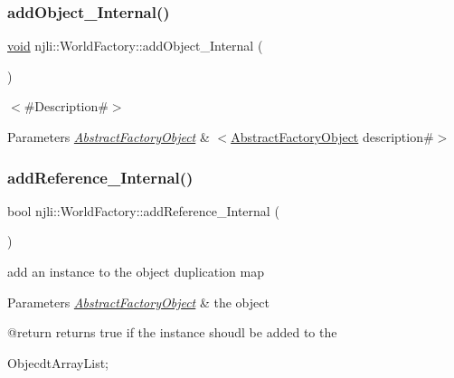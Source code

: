 \subsubsection{\texorpdfstring{add\+Object\+\_\+\+Internal()}{addObject\_Internal()}}
{\footnotesize\ttfamily \mbox{\hyperlink{_thread_8h_af1e856da2e658414cb2456cb6f7ebc66}{void}} njli\+::\+World\+Factory\+::add\+Object\+\_\+\+Internal (\begin{DoxyParamCaption}\item[{\mbox{\hyperlink{classnjli_1_1_abstract_factory_object}{Abstract\+Factory\+Object}} $\ast$}]{ }\end{DoxyParamCaption})\hspace{0.3cm}{\ttfamily [protected]}}

$<$\#\+Description\#$>$


\begin{DoxyParams}{Parameters}
{\em \mbox{\hyperlink{classnjli_1_1_abstract_factory_object}{Abstract\+Factory\+Object}}} & $<$\mbox{\hyperlink{classnjli_1_1_world_factory_a59f5fcb165066624f68fb5417aa3586e}{Abstract\+Factory\+Object}} description\#$>$ \\
\hline
\end{DoxyParams}
\mbox{\label{classnjli_1_1_world_factory_aadfd67f947c9ff8159f20fb3b6a893b0}} 
\subsubsection{\texorpdfstring{add\+Reference\+\_\+\+Internal()}{addReference\_Internal()}}
{\footnotesize\ttfamily bool njli\+::\+World\+Factory\+::add\+Reference\+\_\+\+Internal (\begin{DoxyParamCaption}\item[{\mbox{\hyperlink{classnjli_1_1_abstract_factory_object}{Abstract\+Factory\+Object}} $\ast$}]{ }\end{DoxyParamCaption})\hspace{0.3cm}{\ttfamily [protected]}}

add an instance to the object duplication map


\begin{DoxyParams}{Parameters}
{\em \mbox{\hyperlink{classnjli_1_1_abstract_factory_object}{Abstract\+Factory\+Object}}} & the object \begin{DoxyVerb} @return returns true if the instance shoudl be added to the
\end{DoxyVerb}
 Objecdt\+Array\+List; \\
\hline
\end{DoxyParams}
\mbox{\label{classnjli_1_1_world_factory_a33abb985f896e35cea6e4913826c6a47}} 
